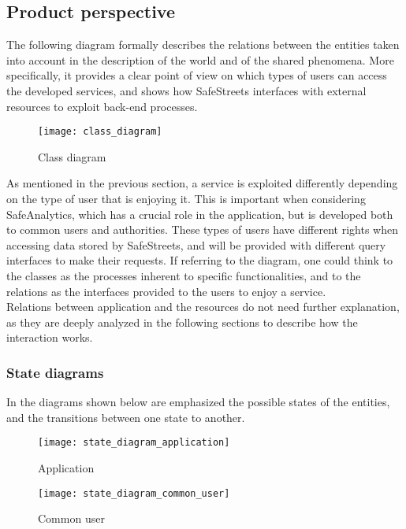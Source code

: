 \documentclass[./main.tex]{subfiles}
\begin{document}
\subsection{Product perspective}

The following diagram formally describes the relations between the
entities taken into account in the description of the world and of the
shared phenomena. More specifically, it provides a clear point of view
on which types of users can access the developed services, and shows how
SafeStreets interfaces with external resources to exploit back-end
processes.

\begin{figure}[H]
\centering
\texttt{[image: class\_diagram]}
\caption{Class diagram}
\end{figure}

As mentioned in the previous section, a service is exploited differently
depending on the type of user that is enjoying it. This is important
when considering SafeAnalytics, which has a crucial role in the
application, but is developed both to common users and authorities.
These types of users have different rights when accessing data stored by
SafeStreets, and will be provided with different query interfaces to
make their requests. If referring to the diagram, one could think to the
classes as the processes inherent to specific functionalities, and to
the relations as the interfaces provided to the users to enjoy a
service.\\
Relations between application and the resources do not need further
explanation, as they are deeply analyzed in the following sections to
describe how the interaction works.

\subsubsection{State diagrams}

In the diagrams shown below are emphasized the possible states of the
entities, and the transitions between one state to another.

\begin{figure}[H]
\centering
\texttt{[image: state\_diagram\_application]}
\caption{Application}
\end{figure}

\begin{figure}[H]
\centering
\texttt{[image: state\_diagram\_common\_user]}
\caption{Common user}
\end{figure}
\end{document}
